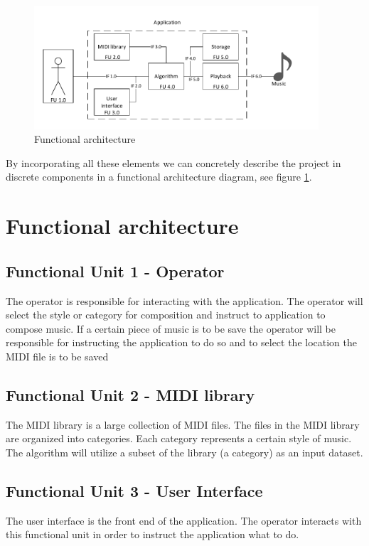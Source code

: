 \begin{figure}
\centerline{\includegraphics[width=400px]{../images/architecture.pdf}}
\caption{Functional architecture}
\label{ims:funcarch}
\end{figure}

By incorporating all these elements we can concretely describe the project in discrete components in a functional architecture diagram, see figure \ref{ims:funcarch}.

\section{Functional architecture}
\subsection{Functional Unit 1 - Operator}
The operator is responsible for interacting with the application. The operator will select the style or category for composition and instruct to application to compose music.
If a certain piece of music is to be save the operator will be responsible for instructing the application to do so and to select the location the \ac{MIDI} file is to be saved

\subsection{Functional Unit 2 - MIDI library }
The MIDI library is a large collection of \ac{MIDI} files. The files in the \ac{MIDI} library are organized into categories. Each category represents a certain style of music.
The algorithm will utilize a subset of the library (a category) as an input dataset.

\subsection{Functional Unit 3 - User Interface}
The user interface is the front end of the application. The operator interacts with this functional unit in order to instruct the application what to do.

